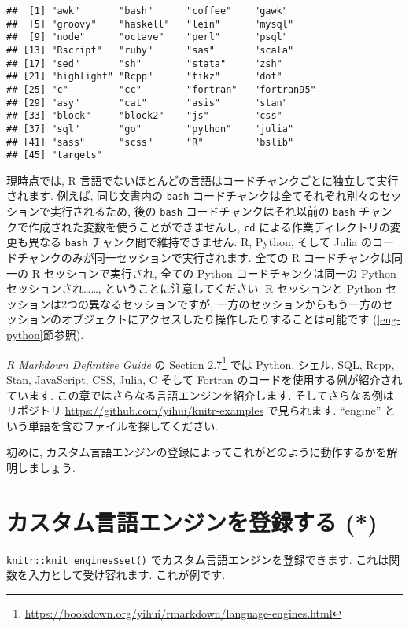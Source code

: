 \documentclass[
  11pt,
  lualatex,ja=standard,jafont=noto]{bxjsreport}
\renewcommand{\href}[2]{#2\footnote{\url{#1}}}
\begin{document}
\begin{verbatim}
##  [1] "awk"       "bash"      "coffee"    "gawk"     
##  [5] "groovy"    "haskell"   "lein"      "mysql"    
##  [9] "node"      "octave"    "perl"      "psql"     
## [13] "Rscript"   "ruby"      "sas"       "scala"    
## [17] "sed"       "sh"        "stata"     "zsh"      
## [21] "highlight" "Rcpp"      "tikz"      "dot"      
## [25] "c"         "cc"        "fortran"   "fortran95"
## [29] "asy"       "cat"       "asis"      "stan"     
## [33] "block"     "block2"    "js"        "css"      
## [37] "sql"       "go"        "python"    "julia"    
## [41] "sass"      "scss"      "R"         "bslib"    
## [45] "targets"
\end{verbatim}

現時点では, R 言語でないほとんどの言語はコードチャンクごとに独立して実行されます. 例えば, 同じ文書内の \texttt{bash} コードチャンクは全てそれぞれ別々のセッションで実行されるため, 後の \texttt{bash} コードチャンクはそれ以前の \texttt{bash} チャンクで作成された変数を使うことができませんし, \texttt{cd} による作業ディレクトリの変更も異なる \texttt{bash} チャンク間で維持できません. R, Python, そして Julia のコードチャンクのみが同一セッションで実行されます. 全ての R コードチャンクは同一の R セッションで実行され, 全ての Python コードチャンクは同一の Python セッションされ\ldots\ldots, ということに注意してください. R セッションと Python セッションは2つの異なるセッションですが, 一方のセッションからもう一方のセッションのオブジェクトにアクセスしたり操作したりすることは可能です (\ref{eng-python}節参照).

\emph{R Markdown Definitive Guide} \autocite{rmarkdown2018} の \href{https://bookdown.org/yihui/rmarkdown/language-engines.html}{Section 2.7} では Python, シェル, SQL, Rcpp, Stan, JavaScript, CSS, Julia, C そして Fortran のコードを使用する例が紹介されています. この章ではさらなる言語エンジンを紹介します. そしてさらなる例はリポジトリ \url{https://github.com/yihui/knitr-examples} で見られます. ``engine'' という単語を含むファイルを探してください.

初めに, カスタム言語エンジンの登録によってこれがどのように動作するかを解明しましょう.

\hypertarget{custom-engine}{%
\section{カスタム言語エンジンを登録する (*)}\label{custom-engine}}

\texttt{knitr::knit\_engines\$set()} でカスタム言語エンジンを登録できます. これは関数を入力として受け容れます. これが例です.
\end{document}
